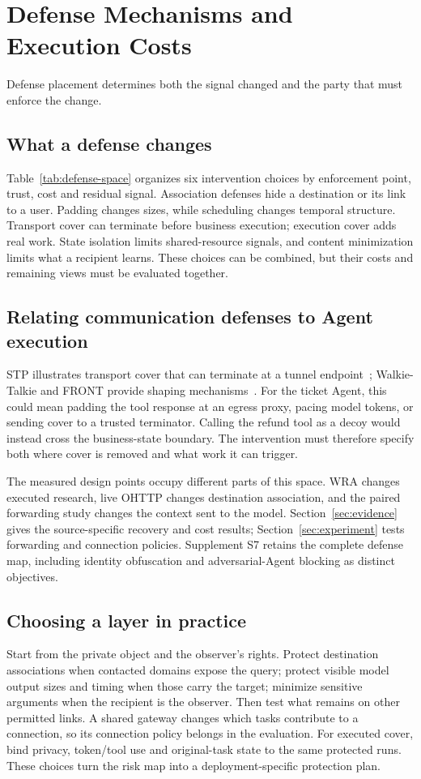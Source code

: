 \section{Defense Mechanisms and Execution Costs}\label{sec:defenses}
Defense placement determines both the signal changed and the party that must enforce the change.
\subsection{What a defense changes}
Table~\ref{tab:defense-space} organizes six intervention choices by enforcement point, trust, cost and residual signal. Association defenses hide a destination or its link to a user. Padding changes sizes, while scheduling changes temporal structure. Transport cover can terminate before business execution; execution cover adds real work. State isolation limits shared-resource signals, and content minimization limits what a recipient learns. These choices can be combined, but their costs and remaining views must be evaluated together.




\subsection{Relating communication defenses to Agent execution}
STP illustrates transport cover that can terminate at a tunnel endpoint~\cite{apthorpe2019stp}; Walkie-Talkie and FRONT provide shaping mechanisms~\cite{wang2017walkietalkie,gong2020front}. For the ticket Agent, this could mean padding the tool response at an egress proxy, pacing model tokens, or sending cover to a trusted terminator. Calling the refund tool as a decoy would instead cross the business-state boundary. The intervention must therefore specify both where cover is removed and what work it can trigger.

The measured design points occupy different parts of this space. WRA changes executed research, live OHTTP changes destination association, and the paired forwarding study changes the context sent to the model. Section~\ref{sec:evidence} gives the source-specific recovery and cost results; Section~\ref{sec:experiment} tests forwarding and connection policies. Supplement S7 retains the complete defense map, including identity obfuscation and adversarial-Agent blocking as distinct objectives.

\subsection{Choosing a layer in practice}
Start from the private object and the observer's rights. Protect destination associations when contacted domains expose the query; protect visible model output sizes and timing when those carry the target; minimize sensitive arguments when the recipient is the observer. Then test what remains on other permitted links. A shared gateway changes which tasks contribute to a connection, so its connection policy belongs in the evaluation. For executed cover, bind privacy, token/tool use and original-task state to the same protected runs. These choices turn the risk map into a deployment-specific protection plan.
